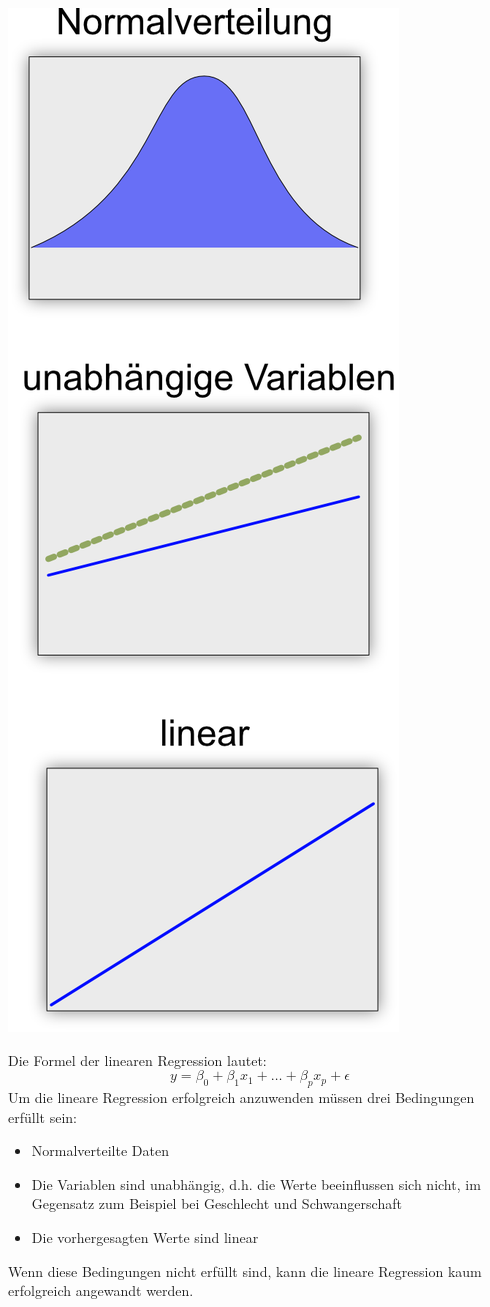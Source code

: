 \documentclass[
  12pt, %
  a4paper, %
  oneside, %
  openany, 
  numbers=noenddot, %
  BCOR=5mm, %
  parskip=half*, %
  thesis, %
]{bfhbook}
\begin{document}
\begin{center}
\begin{minipage}[t]{0.3\linewidth}
	\begin{center}
		\vspace{0pt}
		\includegraphics[width=0.6\linewidth]{Bilder/Regressions-Bedingungen.png}
	\end{center}
\end{minipage}\hfill
\begin{minipage}[t]{0.65\linewidth}
\vspace{0pt}
Die Formel der linearen Regression lautet: \[y = \beta_0  + \beta_1 x_1 + … + \beta_p x_p + \epsilon\]
Um die lineare Regression erfolgreich anzuwenden müssen drei Bedingungen erfüllt sein:
\begin{itemize}
	\item Normalverteilte Daten
	\item Die Variablen sind unabhängig, d.h. die Werte beeinflussen sich nicht, im Gegensatz zum Beispiel bei Geschlecht und Schwangerschaft
	\item Die vorhergesagten Werte sind linear
\end{itemize}
Wenn diese Bedingungen nicht erfüllt sind, kann die lineare Regression kaum erfolgreich angewandt werden.
\end{minipage}
\end{center}
\end{document}
